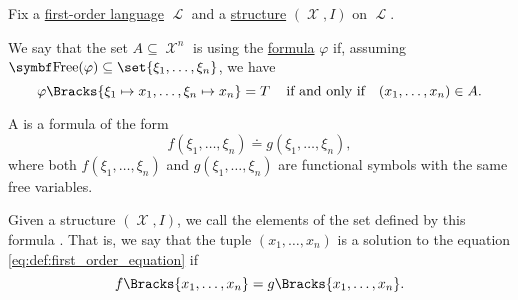 \begin{definition}\label{def:first_order_definability}
  Fix a \hyperref[def:first_order_syntax]{first-order language} \( \mscrL \) and a \hyperref[def:first_order_structure]{structure} \( (\mscrX, I) \) on \( \mscrL \).

  We say that the set \( A \subseteq \mscrX^n \) is  using the \hyperref[def:first_order_syntax]{formula} \( \varphi \) if, assuming \( {\bfop{Free}(\varphi) \subseteq \set{ \xi_1, \ldots, \xi_n }} \), we have
  \begin{equation*}
    \varphi\Bracks{\xi_1 \mapsto x_1, \ldots, \xi_n \mapsto x_n} = T \quad\T{if and only if}\quad (x_1, \ldots, x_n) \in A.
  \end{equation*}
\end{definition}

\begin{definition}\label{def:first_order_equation}
  A  is a formula of the form
  \begin{equation}\label{eq:def:first_order_equation}
    f(\xi_1, \ldots, \xi_n) \doteq g(\xi_1, \ldots, \xi_n),
  \end{equation}
  where both \( f(\xi_1, \ldots, \xi_n) \) and \( g(\xi_1, \ldots, \xi_n) \) are functional symbols with the same free variables.

  Given a structure \( (\mscrX, I) \), we call the elements of the set defined by this formula . That is, we say that the tuple \( (x_1, \ldots, x_n) \) is a solution to the equation \eqref{eq:def:first_order_equation} if
  \begin{equation*}
    f\Bracks{x_1, \ldots, x_n} = g\Bracks{x_1, \ldots, x_n}.
  \end{equation*}
\end{definition}


